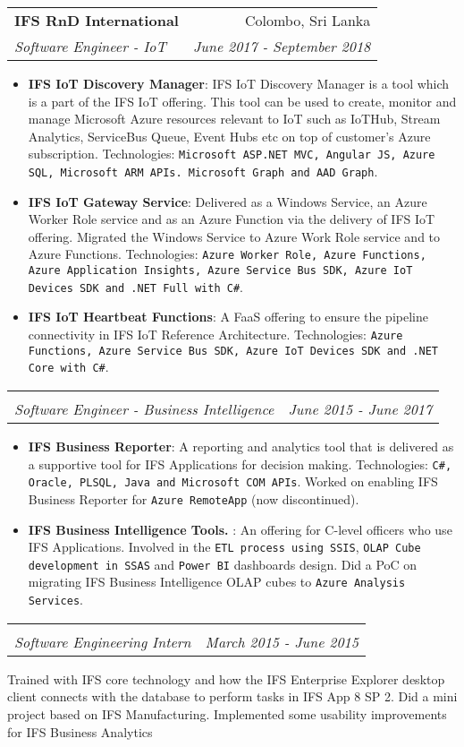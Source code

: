 \documentclass[a4paper,11pt]{article}
\makeatletter
\newcommand{\resumeItem}[2]{
  \item\small{
    \textbf{#1}{: #2 \vspace{-2pt}}
  }
}
\newcommand{\resumeSubheading}[4]{
  \vspace{-1pt}\item
    \begin{tabular*}{0.97\textwidth}{l@{\extracolsep{\fill}}r}
      \textbf{#1} & #2 \\
      \textit{\small#3} & \textit{\small #4} \\
    \end{tabular*}\vspace{-5pt}
}
\newcommand{\resumeItemListStart}{\begin{itemize}}
\newcommand{\resumeItemListEnd}{\end{itemize}\vspace{-5pt}}
\makeatother
\begin{document}
    \resumeSubheading
      {IFS RnD International}{Colombo, Sri Lanka}
      {Software Engineer - IoT}{June 2017 - September 2018}
      \resumeItemListStart
        \resumeItem{IFS IoT Discovery Manager}
          {IFS IoT Discovery Manager is a tool which is a part of the IFS IoT offering. This tool can be used to create, monitor and manage Microsoft Azure resources relevant to IoT such as IoTHub, Stream Analytics, ServiceBus Queue, Event Hubs etc on top of customer's Azure subscription. Technologies: \texttt{Microsoft ASP.NET MVC, Angular JS, Azure SQL, Microsoft ARM APIs. Microsoft Graph and AAD Graph}.}
        \resumeItem{IFS IoT Gateway Service}
          {Delivered as a Windows Service, an Azure Worker Role service and as an Azure Function via the delivery of IFS IoT offering. Migrated the Windows Service to Azure Work Role service and to Azure Functions. Technologies: \texttt{Azure Worker Role, Azure Functions, Azure Application Insights, Azure Service Bus SDK, Azure IoT Devices SDK and .NET Full with C\#}. }
        \resumeItem{IFS IoT Heartbeat Functions}
          {A FaaS offering to ensure the pipeline connectivity in IFS IoT Reference Architecture. Technologies: \texttt{Azure Functions, Azure Service Bus SDK, Azure IoT Devices SDK and .NET Core with C\#}.}
      \resumeItemListEnd
      
    \resumeSubheading {}{}
      {Software Engineer - Business Intelligence}{June 2015 - June 2017}
      \resumeItemListStart
        \resumeItem{IFS Business Reporter}
          {A reporting and analytics tool that is delivered as a supportive tool for IFS Applications for decision making. Technologies: \texttt{C\#, Oracle, PLSQL, Java and Microsoft COM APIs}. Worked on enabling IFS Business Reporter for \texttt{Azure RemoteApp} (now discontinued).}
        \resumeItem{IFS Business Intelligence Tools. }
          {An offering for C-level officers who use IFS Applications. Involved in the \texttt{ETL process using SSIS}, \texttt{OLAP Cube development in SSAS} and \texttt{Power BI} dashboards design. Did a PoC on migrating IFS Business Intelligence OLAP cubes to  \texttt{Azure Analysis Services}.}
      \resumeItemListEnd  
      
    \resumeSubheading{}{}
      {Software Engineering Intern}{March 2015 - June 2015}
      \resumeItemListStart
        {Trained with IFS core technology and how the IFS Enterprise Explorer desktop client connects with the database to perform tasks in IFS App 8 SP 2. Did a mini project based on IFS Manufacturing. Implemented some usability improvements for IFS Business Analytics}
      \resumeItemListEnd           
      
\end{document}
